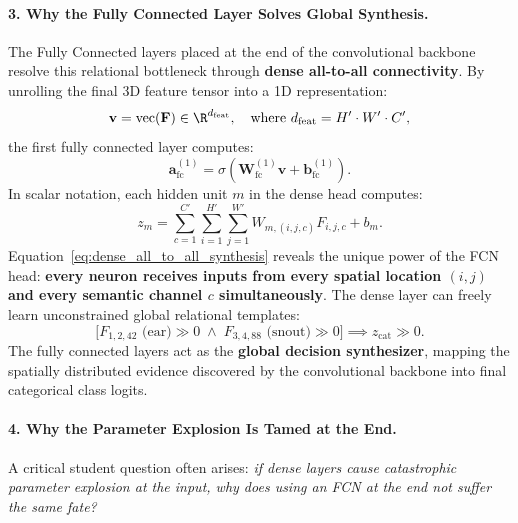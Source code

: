 \paragraph{3. Why the Fully Connected Layer Solves Global Synthesis.}
The Fully Connected layers placed at the end of the convolutional backbone resolve this relational bottleneck through \textbf{dense all-to-all connectivity}. By unrolling the final 3D feature tensor into a 1D representation:
\begin{equation}
\mathbf{v} = \operatorname{vec}(\mathbf{F}) \in \R^{d_{\text{feat}}}, \quad \text{where } d_{\text{feat}} = H' \cdot W' \cdot C',
\end{equation}
the first fully connected layer computes:
\begin{equation}
\mathbf{a}_{\text{fc}}^{(1)} = \sigma\left( \mathbf{W}_{\text{fc}}^{(1)} \mathbf{v} + \mathbf{b}_{\text{fc}}^{(1)} \right).
\end{equation}
In scalar notation, each hidden unit $m$ in the dense head computes:
\begin{equation}
z_m = \sum_{c=1}^{C'} \sum_{i=1}^{H'} \sum_{j=1}^{W'} W_{m, (i, j, c)} F_{i, j, c} + b_m.
\label{eq:dense_all_to_all_synthesis}
\end{equation}
Equation~\eqref{eq:dense_all_to_all_synthesis} reveals the unique power of the FCN head: \textbf{every neuron receives inputs from every spatial location $(i, j)$ and every semantic channel $c$ simultaneously}. The dense layer can freely learn unconstrained global relational templates:
\begin{equation}
\big[ F_{1, 2, 42} \text{ (ear)} \gg 0 \;\land\; F_{3, 4, 88} \text{ (snout)} \gg 0 \big] \implies z_{\text{cat}} \gg 0.
\end{equation}
The fully connected layers act as the \textbf{global decision synthesizer}, mapping the spatially distributed evidence discovered by the convolutional backbone into final categorical class logits.

\paragraph{4. Why the Parameter Explosion Is Tamed at the End.}
A critical student question often arises: \textit{if dense layers cause catastrophic parameter explosion at the input, why does using an FCN at the end not suffer the same fate?}

